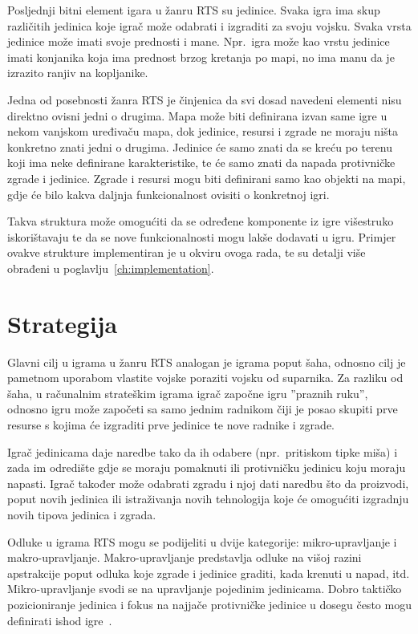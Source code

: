 \documentclass[times, utf8, zavrsni, numeric]{fer}
\begin{document}
\par Posljednji bitni element igara u žanru RTS su jedinice. 
Svaka igra ima skup različitih jedinica koje igrač može odabrati i izgraditi za svoju vojsku.
Svaka vrsta jedinice može imati svoje prednosti i mane.
Npr.\ igra može kao vrstu jedinice imati konjanika koja ima prednost brzog kretanja po mapi, no ima manu da je izrazito ranjiv na kopljanike.

\par Jedna od posebnosti žanra RTS je činjenica da svi dosad navedeni elementi nisu direktno ovisni jedni o drugima.
Mapa može biti definirana izvan same igre u nekom vanjskom uređivaču mapa, dok jedinice, resursi i zgrade ne moraju ništa konkretno znati jedni o drugima.
Jedinice će samo znati da se kreću po terenu koji ima neke definirane karakteristike, te će samo znati da napada protivničke zgrade i jedinice. 
Zgrade i resursi mogu biti definirani samo kao objekti na mapi, gdje će bilo kakva daljnja funkcionalnost ovisiti o konkretnoj igri.

\par Takva struktura može omogućiti da se određene komponente iz igre višestruko iskorištavaju te da se nove funkcionalnosti mogu lakše dodavati u igru.
Primjer ovakve strukture implementiran je u okviru ovoga rada, te su detalji više obrađeni u poglavlju~\ref{ch:implementation}.

\section{Strategija}

\par Glavni cilj u igrama u žanru RTS analogan je igrama poput šaha, odnosno cilj je pametnom uporabom vlastite vojske poraziti vojsku od suparnika. 
Za razliku od šaha, u računalnim strateškim igrama igrač započne igru ''praznih ruku'', odnosno igru može započeti sa samo jednim radnikom čiji je posao skupiti prve resurse s kojima će izgraditi prve jedinice te nove radnike i zgrade.

\par Igrač jedinicama daje naredbe tako da ih odabere (npr.\ pritiskom tipke miša) i zada im odredište gdje se moraju pomaknuti ili protivničku jedinicu koju moraju napasti. 
Igrač također može odabrati zgradu i njoj dati naredbu što da proizvodi, poput novih jedinica ili istraživanja novih tehnologija koje će omogućiti izgradnju novih tipova jedinica i zgrada.

\par Odluke u igrama RTS mogu se podijeliti u dvije kategorije: mikro-upravljanje i makro-upravljanje. 
Makro-upravljanje predstavlja odluke na višoj razini apstrakcije poput odluka koje zgrade i jedinice graditi, kada krenuti u napad, itd. 
Mikro-upravljanje svodi se na upravljanje pojedinim jedinicama.
Dobro taktičko pozicioniranje jedinica i fokus na najjače protivničke jedinice u dosegu često mogu definirati ishod igre~\cite{article:HybridPathdinding}.
\end{document}
